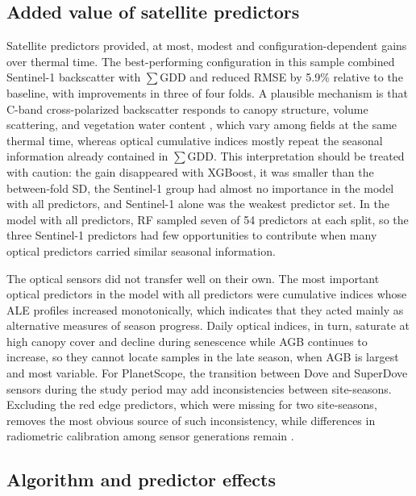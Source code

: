 \documentclass[
  english,
  review,
  number,
  sort,compress,
  authoryear,
  3p]{elsarticle}
\begin{document}
\subsection{Added value of satellite
predictors}\label{added-value-of-satellite-predictors}

Satellite predictors provided, at most, modest and
configuration-dependent gains over thermal time. The best-performing
configuration in this sample combined Sentinel-1 backscatter with
\(\sum\)GDD and reduced RMSE by 5.9\% relative to the baseline, with
improvements in three of four folds. A plausible mechanism is that
C-band cross-polarized backscatter responds to canopy structure, volume
scattering, and vegetation water content \citep{Veloso2017}, which vary
among fields at the same thermal time, whereas optical cumulative
indices mostly repeat the seasonal information already contained in
\(\sum\)GDD. This interpretation should be treated with caution: the
gain disappeared with XGBoost, it was smaller than the between-fold SD,
the Sentinel-1 group had almost no importance in the model with all
predictors, and Sentinel-1 alone was the weakest predictor set. In the
model with all predictors, RF sampled seven of 54 predictors at each
split, so the three Sentinel-1 predictors had few opportunities to
contribute when many optical predictors carried similar seasonal
information.

The optical sensors did not transfer well on their own. The most
important optical predictors in the model with all predictors were
cumulative indices whose ALE profiles increased monotonically, which
indicates that they acted mainly as alternative measures of season
progress. Daily optical indices, in turn, saturate at high canopy cover
and decline during senescence while AGB continues to increase, so they
cannot locate samples in the late season, when AGB is largest and most
variable. For PlanetScope, the transition between Dove and SuperDove
sensors during the study period may add inconsistencies between
site-seasons. Excluding the red edge predictors, which were missing for
two site-seasons, removes the most obvious source of such inconsistency,
while differences in radiometric calibration among sensor generations
remain \citep{Roy2021}.

\subsection{Algorithm and predictor
effects}\label{algorithm-and-predictor-effects}
\end{document}
